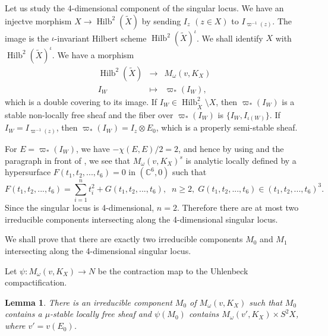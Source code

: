 \documentclass[leqno,11pt]{amsart}
\def\C{\ensuremath{\mathbb{C}}}
\def\Hilb{\mathop{\mathrm{Hilb}}\nolimits}
\newtheorem{Lem}[Thm]{Lemma}
\theoremstyle{definition}
\def\C{\ensuremath{\mathbb{C}}}
\begin{document}
Let us study the 4-dimensional component of the singular locus.
We have an injectve morphism $X \to \Hilb^2(\widetilde{X})$ by sending
$I_z$ $(z \in X)$ to $I_{\varpi^{-1}(z)}$.
The image is the $\iota$-invariant Hilbert scheme $\Hilb^2(\widetilde{X})^{\iota}$.
We shall identify $X$ with  $\Hilb^2(\widetilde{X})^{\iota}$.
We have a morphism
$$
\begin{matrix}
\Hilb^2(\widetilde{X}) & \to & M_\omega(v,K_X)\\
I_W & \mapsto & \varpi_*(I_W),
\end{matrix}
$$
 which is a double covering to
its image.
If $I_W \in \Hilb_{\widetilde{X}}^2 \setminus X$, then
$\varpi_*(I_W)$ is a stable non-locally free sheaf and
the fiber over $\varpi_*(I_W)$ is $\{ I_W, I_{\iota(W)} \}$.
If $I_W=I_{\varpi^{-1}(z)}$, then 
$\varpi_*(I_W)=I_z \otimes E_0$, which is a properly semi-stable
sheaf.

For $E=\varpi_*(I_W)$, we have $-\chi(E,E)/2=2$, and hence
by using
\cite[Fact 2.4]{Yamada} and the paragraph in front of \cite[Lem. 2.13]{Yamada},
we see that 
$M_\omega(v,K_X)^s$ is analytic locally defined by 
a hypersurface  $F(t_1,t_2,...,t_6)=0$ in $(\C^6,0)$
such that 
$$
F(t_1,t_2,...,t_6)=\sum_{i=1}^n t_i^2+G(t_1,t_2,...,t_6),\;\;
n \geq 2,\; G(t_1,t_2,...,t_6) \in (t_1,t_2,...,t_6)^3.
$$
Since the singular locus is 4-dimensional,
$n=2$. 
 Therefore there are at most two irreducible components intersecting
along the 4-dimensional singular locus.

We shall prove that there are exactly two irreducible components $M_0$ and $M_1$
intersecting along the 4-dimensional singular locus. 

 


Let $\psi:M_\omega(v,K_X) \to N$ be the contraction map to the 
Uhlenbeck compactification.
\begin{Lem}\label{lem:M_0}
There is an irreducible component
$M_0$ of $M_\omega(v,K_X)$ 
such that $M_0$ contains a $\mu$-stable locally free sheaf and
$\psi(M_0)$ contains $M_\omega(v',K_X) \times S^2 X$,
where $v'=v(E_0)$.
\end{Lem}
\end{document}
